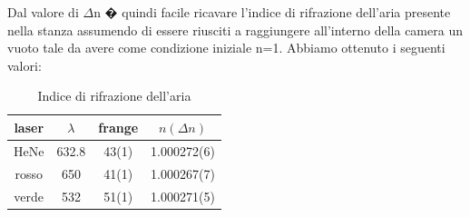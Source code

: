 \documentclass[a4paper]{article}
\begin{document}
\begin{multicols}{2}
Dal valore di $\Delta$n � quindi facile ricavare l'indice di rifrazione dell'aria presente nella stanza assumendo di essere riusciti a raggiungere all'interno della camera un vuoto tale da avere come condizione iniziale n=1. Abbiamo ottenuto i seguenti valori:


\begin{table}[H]
	\centering
	\begin{tabular}{|c|c|c|c|}
		\hline
		laser & $\lambda$ & frange  & $n(\Delta n)$ \\
		\hline
		HeNe & 632.8 & 43(1) &1.000272(6)\\
		rosso & 650 & 41(1) &1.000267(7)\\ 
		verde & 532 & 51(1) &1.000271(5)\\
		\hline
	\end{tabular}
	\caption{Indice di rifrazione dell'aria}
	\label{tab:n}
\end{table}

\end{multicols}
\end{document}
